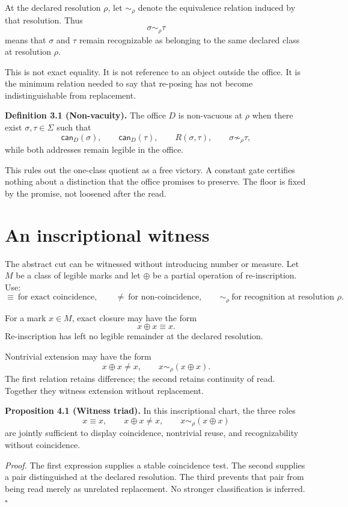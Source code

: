 \documentclass[11pt]{article}
\newcommand{\can}{\mathsf{can}}
\begin{document}
At the declared resolution $\rho$, let $\sim_\rho$ denote the equivalence relation induced by that resolution. Thus
\[
\sigma\sim_\rho\tau
\]
means that $\sigma$ and $\tau$ remain recognizable as belonging to the same declared class at resolution $\rho$.

This is not exact equality. It is not reference to an object outside the office. It is the minimum relation needed to say that re-posing has not become indistinguishable from replacement.

\textbf{Definition 3.1 (Non-vacuity).}
The office $D$ is non-vacuous at $\rho$ when there exist $\sigma,\tau\in\Sigma$ such that
\[
\can_D(\sigma),\qquad \can_D(\tau),\qquad R(\sigma,\tau),\qquad \sigma\not\sim_\rho\tau,
\]
while both addresses remain legible in the office.

This rules out the one-class quotient as a free victory. A constant gate certifies nothing about a distinction that the office promises to preserve. The floor is fixed by the promise, not loosened after the read.

\section{An inscriptional witness}

The abstract cut can be witnessed without introducing number or measure. Let $M$ be a class of legible marks and let $\oplus$ be a partial operation of re-inscription. Use:
\[
\equiv\ \text{for exact coincidence},\qquad
\neq\ \text{for non-coincidence},\qquad
\sim_\rho\ \text{for recognition at resolution }\rho.
\]

For a mark $x\in M$, exact closure may have the form
\[
x\oplus x\equiv x.
\]
Re-inscription has left no legible remainder at the declared resolution.

Nontrivial extension may have the form
\[
x\oplus x\neq x,
\qquad
x\sim_\rho(x\oplus x).
\]
The first relation retains difference; the second retains continuity of read. Together they witness extension without replacement.

\textbf{Proposition 4.1 (Witness triad).}
In this inscriptional chart, the three roles
\[
 x\equiv x,
 \qquad
 x\oplus x\neq x,
 \qquad
 x\sim_\rho(x\oplus x)
\]
are jointly sufficient to display coincidence, nontrivial reuse, and recognizability without coincidence.

\textit{Proof.}
The first expression supplies a stable coincidence test. The second supplies a pair distinguished at the declared resolution. The third prevents that pair from being read merely as unrelated replacement. No stronger classification is inferred. \hfill$\square$
\end{document}
